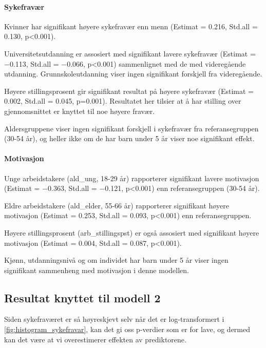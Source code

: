 \documentclass[
  12pt,
  a4paper,
  DIV=11,
  numbers=noendperiod]{scrartcl}
\let\oldparagraph\paragraph
\renewcommand{\paragraph}[1]{\oldparagraph{#1}\mbox{}}
\begin{document}
\paragraph{Sykefravær}\label{sykefravuxe6r-1}

Kvinner har signifikant høyere sykefravær enn menn (Estimat = 0.216,
Std.all = 0.130, p\textless0.001).

Universitetsutdanning er assosiert med signifikant lavere sykefravær
(Estimat = −0.113, Std.all = −0.066, p\textless0.001) sammenlignet med
de med videregående utdanning. Grunnskoleutdanning viser ingen
signifikant forskjell fra videregående.

Høyere stillingsprosent gir signifikant resultat på høyere sykefravær
(Estimat = 0.002, Std.all = 0.045, p=0.001). Resultatet her tilsier at å
har stilling over gjennomsnittet er knyttet til noe høyere fravær.

Aldersgruppene viser ingen signifikant forskjell i sykefravær fra
referansegruppen (30-54 år), og heller ikke om de har barn under 5 år
viser noe signifikant effekt.

\paragraph{Motivasjon}\label{motivasjon-1}

Unge arbeidstakere (ald\_ung, 18-29 år) rapporterer signifikant lavere
motivasjon (Estimat = −0.363, Std.all = −0.121, p\textless0.001) enn
referansegruppen (30-54 år).

Eldre arbeidstakere (ald\_elder, 55-66 år) rapporterer signifikant
høyere motivasjon (Estimat = 0.253, Std.all = 0.093, p\textless0.001)
enn referansegruppen.

Høyere stillingsprosent (arb\_stillingspst) er også assosiert med
signifikant høyere motivasjon (Estimat = 0.004, Std.all = 0.087,
p\textless0.001).

Kjønn, utdanningsnivå og om individet har barn under 5 år viser ingen
signifikant sammenheng med motivasjon i denne modellen.

\subsection{Resultat knyttet til modell
2}\label{resultat-knyttet-til-modell-2}

Siden sykefraværet er så høyreskjevt selv når det er log-transformert i
\autoref{fig:histogram_sykefravar}, kan det gi oss p-verdier som er for
lave, og dermed kan det være at vi overestimerer effekten av
prediktorene.
\end{document}
